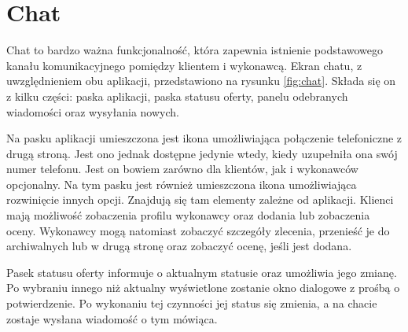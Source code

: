 \section{Chat}

Chat to bardzo ważna funkcjonalność, która zapewnia istnienie podstawowego kanału komunikacyjnego pomiędzy klientem i wykonawcą. Ekran chatu, z uwzględnieniem obu aplikacji, przedstawiono na rysunku \ref{fig:chat}. Składa się on z kilku części: paska aplikacji, paska statusu oferty, panelu odebranych wiadomości oraz wysyłania nowych.

Na pasku aplikacji umieszczona jest ikona umożliwiająca połączenie telefoniczne z drugą stroną. Jest ono jednak dostępne jedynie wtedy, kiedy uzupełniła ona swój numer telefonu. Jest on bowiem zarówno dla klientów, jak i wykonawców opcjonalny. Na tym pasku jest również umieszczona ikona umożliwiająca rozwinięcie innych opcji. Znajdują się tam elementy zależne od aplikacji. Klienci mają możliwość zobaczenia profilu wykonawcy oraz dodania lub zobaczenia oceny. Wykonawcy mogą natomiast zobaczyć szczegóły zlecenia, przenieść je do archiwalnych lub w drugą stronę oraz zobaczyć ocenę, jeśli jest dodana.

Pasek statusu oferty informuje o aktualnym statusie oraz umożliwia jego zmianę. Po wybraniu innego niż aktualny wyświetlone zostanie okno dialogowe z prośbą o potwierdzenie. Po wykonaniu tej czynności jej status się zmienia, a na chacie zostaje wysłana wiadomość o tym mówiąca.


